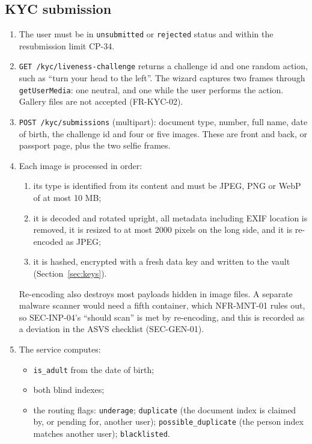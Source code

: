 \documentclass[11pt,a4paper]{article}
\begin{document}
\subsection{KYC submission}
\label{sec:flow-kyc}
\begin{enumerate}[nosep]
  \item The user must be in \texttt{unsubmitted} or \texttt{rejected} status and within the resubmission limit CP-34.
  \item \texttt{GET /kyc/liveness-challenge} returns a challenge id and one random action, such as ``turn your head to the left''. The wizard captures two frames through \texttt{getUserMedia}: one neutral, and one while the user performs the action. Gallery files are not accepted (FR-KYC-02).
  \item \texttt{POST /kyc/submissions} (multipart): document type, number, full name, date of birth, the challenge id and four or five images. These are front and back, or passport page, plus the two selfie frames.
  \item Each image is processed in order:
  \begin{enumerate}[nosep]
    \item its type is identified from its content and must be JPEG, PNG or WebP of at most 10 MB;
    \item it is decoded and rotated upright, all metadata including EXIF location is removed, it is resized to at most 2000 pixels on the long side, and it is re-encoded as JPEG;
    \item it is hashed, encrypted with a fresh data key and written to the vault (Section~\ref{sec:keys}).
  \end{enumerate}
  Re-encoding also destroys most payloads hidden in image files. A separate malware scanner would need a fifth container, which NFR-MNT-01 rules out, so SEC-INP-04's ``should scan'' is met by re-encoding, and this is recorded as a deviation in the ASVS checklist (SEC-GEN-01).
  \item The service computes:
  \begin{itemize}[nosep]
    \item \texttt{is\_adult} from the date of birth;
    \item both blind indexes;
    \item the routing flags: \texttt{underage}; \texttt{duplicate} (the document index is claimed by, or pending for, another user); \texttt{possible\_duplicate} (the person index matches another user); \texttt{blacklisted}.
  \end{itemize}

\end{enumerate}
\end{document}
